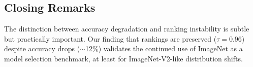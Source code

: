 \subsection{Closing Remarks}

The distinction between accuracy degradation and ranking instability is subtle but practically important. Our finding that rankings are preserved ($\tau = 0.96$) despite accuracy drops ($\sim$12\%) validates the continued use of ImageNet as a model selection benchmark, at least for ImageNet-V2-like distribution shifts.
